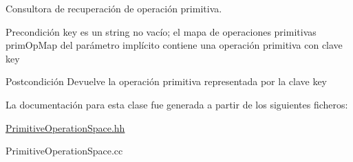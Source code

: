 Consultora de recuperación de operación primitiva. 

\begin{DoxyPrecond}{Precondición}
\textquotesingle{}key\textquotesingle{} es un string no vacío; el mapa de operaciones primitivas \textquotesingle{}prim\+Op\+Map\textquotesingle{} del parámetro implícito contiene una operación primitiva con clave \textquotesingle{}key\textquotesingle{} 
\end{DoxyPrecond}
\begin{DoxyPostcond}{Postcondición}
Devuelve la operación primitiva representada por la clave \textquotesingle{}key\textquotesingle{} 
\end{DoxyPostcond}


La documentación para esta clase fue generada a partir de los siguientes ficheros\+:\begin{DoxyCompactItemize}
\item 
\hyperlink{_primitive_operation_space_8hh}{Primitive\+Operation\+Space.\+hh}\item 
Primitive\+Operation\+Space.\+cc\end{DoxyCompactItemize}
